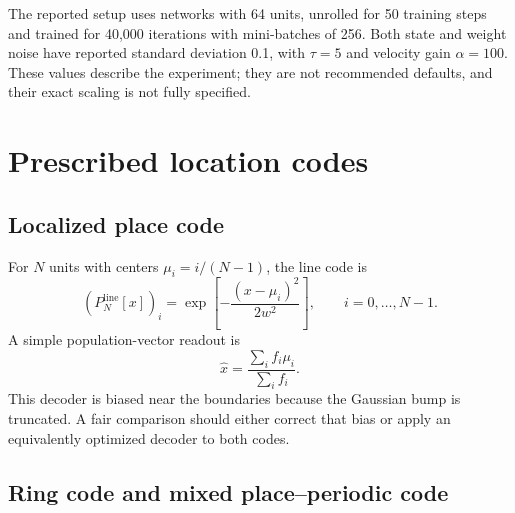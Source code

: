 The reported setup uses networks with 64 units, unrolled for 50 training steps and trained for 40,000 iterations with mini-batches of 256. Both state and weight noise have reported standard deviation 0.1, with $\tau=5$ and velocity gain $\alpha=100$. These values describe the experiment; they are not recommended defaults, and their exact scaling is not fully specified.

\section{Prescribed location codes}
\label{sec:attractor-codes}

\subsection{Localized place code}

For $N$ units with centers $\mu_i=i/(N-1)$, the line code is
\begin{equation}
\label{eq:place-line-code}
\left(P_N^{\mathrm{line}}[x]\right)_i
=\exp\left[-\frac{(x-\mu_i)^2}{2w^2}\right],
\qquad i=0,\ldots,N-1.
\end{equation}
A simple population-vector readout is
\begin{equation}
\label{eq:place-readout}
\hat{x}
=\frac{\sum_i f_i\mu_i}{\sum_i f_i}.
\end{equation}
This decoder is biased near the boundaries because the Gaussian bump is truncated. A fair comparison should either correct that bias or apply an equivalently optimized decoder to both codes.

\subsection{Ring code and mixed place--periodic code}

